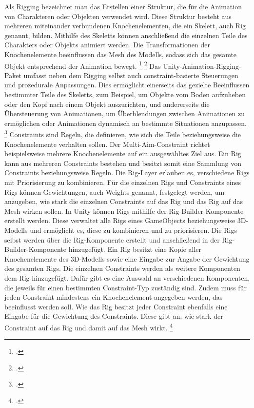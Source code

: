 Als Rigging bezeichnet man das Erstellen einer Struktur, die für die Animation von Charakteren oder Objekten verwendet wird. Diese Struktur besteht aus mehreren miteinander verbundenen Knochenelementen, die ein Skelett, auch Rig genannt, bilden. Mithilfe des Skeletts können anschließend die einzelnen Teile des Charakters oder Objekts animiert werden. Die Transformationen der Knochenelemente beeinflussen das Mesh des Modells, sodass sich das gesamte Objekt entsprechend der Animation bewegt. \footcite[\vglf][]{riggingBasics} \footcite[\vglf][]{characterRiggingForGames}
Das Unity-Animation-Rigging-Paket umfasst neben dem Rigging selbst auch constraint-basierte Steuerungen und prozedurale Anpassungen. Dies ermöglicht einerseits das gezielte Beeinflussen bestimmter Teile des Skeletts, zum Beispiel, um Objekte vom Boden aufzuheben oder den Kopf nach einem Objekt auszurichten, und andererseits die Übersteuerung von Animationen, um Überblendungen zwischen Animationen zu ermöglichen oder Animationen dynamisch an bestimmte Situationen anzupassen. \footcite[\vglf][]{unity.animationRigging}
Constraints sind Regeln, die definieren, wie sich die Teile beziehungsweise die Knochenelemente verhalten sollen. Der Multi-Aim-Constraint richtet beispielsweise mehrere Knochenelemente auf ein ausgewähltes Ziel aus. Ein Rig kann aus mehreren Constraints bestehen und besitzt somit eine Sammlung von Constraints beziehungsweise Regeln. Die Rig-Layer erlauben es, verschiedene Rigs mit Priorisierung zu kombinieren. Für die einzelnen Rigs und Constraints eines Rigs können Gewichtungen, auch Weights genannt, festgelegt werden, um anzugeben, wie stark die einzelnen Constraints auf das Rig und das Rig auf das Mesh wirken sollen.
In Unity können Rigs mithilfe der Rig-Builder-Komponente erstellt werden. Diese verwaltet alle Rigs eines GameObjects beziehungsweise 3D-Modells und ermöglicht es, diese zu kombinieren und zu priorisieren. Die Rigs selbst werden über die Rig-Komponente erstellt und anschließend in der Rig-Builder-Komponente hinzugefügt. Ein Rig besitzt eine Kopie aller Knochenelemente des 3D-Modells sowie eine Eingabe zur Angabe der Gewichtung des gesamten Rigs. Die einzelnen Constraints werden als weitere Komponenten dem Rig hinzugefügt. Dafür gibt es eine Auswahl an verschiedenen Komponenten, die jeweils für einen bestimmten Constraint-Typ zuständig sind. Zudem muss für jeden Constraint mindestens ein Knochenelement angegeben werden, das beeinflusst werden soll. Wie das Rig besitzt jeder Constraint ebenfalls eine Eingabe für die Gewichtung des Constraints. Diese gibt an, wie stark der Constraint auf das Rig und damit auf das Mesh wirkt. \footcite[\vglf][]{unity.animationRiggingManual}